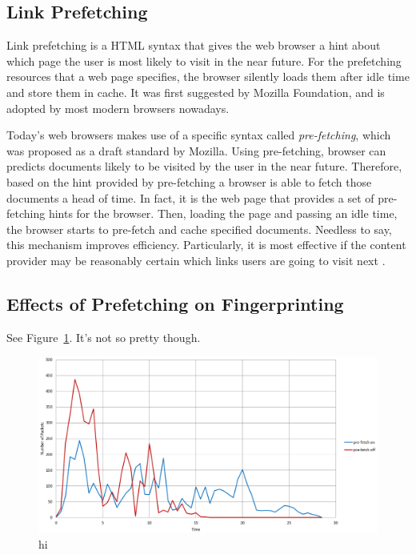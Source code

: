 
\subsection{Link Prefetching}

Link prefetching is a HTML syntax that gives the web browser a hint about which page the user is most likely to visit in the near future.
For the prefetching resources that a web page specifies, the browser silently loads them after idle time and store them in cache. 
It was first suggested by Mozilla Foundation, and is adopted by most modern browsers nowadays.

Today's web browsers makes use of a specific syntax called \emph{pre-fetching}, which was proposed as a draft standard by Mozilla.
Using pre-fetching, browser can predicts documents likely to be visited by the user in the near future.
Therefore, based on the hint provided by pre-fetching a browser is able to fetch those documents a head of time.
In fact, it is the web page that provides a set of pre-fetching hints for the browser.
Then, loading the page and passing an idle time, the browser starts to pre-fetch and cache specified documents.
Needless to say, this mechanism improves efficiency.
Particularly, it is most effective if the content provider may be reasonably certain which links users are going to visit next \cite{wikiPreF}.

\subsection{Effects of Prefetching on Fingerprinting}

See Figure~\ref{fig:prefetch}. It's not so pretty though.
\begin{figure}[h]
\includegraphics[width=\columnwidth]{figures/prefetch.png}
\centering
\caption{hi}
\label{fig:prefetch}
\end{figure}


